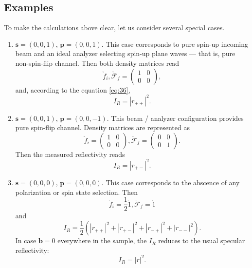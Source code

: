\documentclass[12pt,a4paper]{article}
\begin{document}
\subsection{Examples} \label{ssec:examples}
To make the calculations above clear, let us consider several special cases.

\begin{enumerate}
\item $\boldsymbol{s} = (0, 0, 1)$, $\boldsymbol{p} = (0, 0, 1)$.
This case corresponds to pure spin-up incoming beam and an ideal analyzer selecting spin-up plane waves --- that is, pure non-spin-flip channel.
Then both density matrices read
\begin{equation*}
\check{f}_i, \check{\mathcal{F}}_f
=
\left(
\begin{matrix}
1 & 0 \\
0 & 0
\end{matrix}
\right),
\end{equation*}
and, according to the equation \ref{eq:36},
\begin{equation*}
I_R = |r_{++}|^2.
\end{equation*}

\item $\boldsymbol{s} = (0, 0, 1)$, $\boldsymbol{p} = (0, 0, -1)$. This beam / analyzer configuration provides pure spin-flip channel.
Density matrices are represented as
\begin{equation*}
\check{f}_i
=
\left(
\begin{matrix}
1 & 0 \\
0 & 0
\end{matrix}
\right),
\check{\mathcal{F}}_f
=
\left(
\begin{matrix}
0 & 0 \\
0 & 1
\end{matrix}
\right).
\end{equation*}
Then the measured reflectivity reads
\begin{equation*}
I_R = |r_{+-}|^2.
\end{equation*}

\item $\boldsymbol{s} = (0, 0, 0)$, $\boldsymbol{p} = (0, 0, 0)$. This case corresponds to the abscence of any polarization or spin state selection. Then
\begin{equation*}
\check{f}_i = \frac{1}{2} \check{1}, \check{\mathcal{F}}_f = \check{1}
\end{equation*}
and
\begin{equation*}
I_R = \frac{1}{2} \left( |r_{++}|^2 + |r_{+-}|^2 + |r_{-+}|^2 + |r_{--}|^2\right).
\end{equation*}
In case $\boldsymbol{b} = 0$ everywhere in the sample, the $I_R$ reduces to the usual specular reflectivity:
\begin{equation*}
I_R = |r|^2.
\end{equation*}

\end{enumerate}
\end{document}
